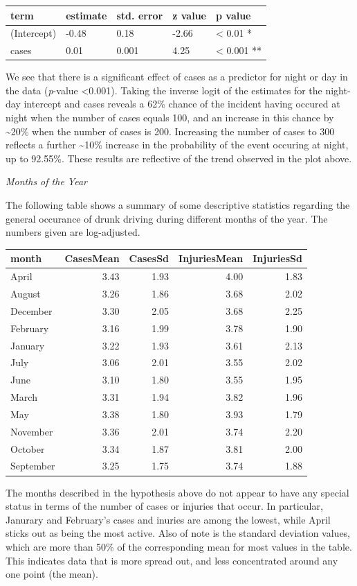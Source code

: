 \documentclass[floatsintext,man]{apa6}
\theoremstyle{definition}
\theoremstyle{definition}
\theoremstyle{definition}
\theoremstyle{remark}
\begin{document}
\begin{longtable}[]{@{}lllll@{}}
\toprule
term & estimate & std. error & z value & p value\tabularnewline
\midrule
\endhead
(Intercept) & -0.48 & 0.18 & -2.66 & \textless{} 0.01 *\tabularnewline
cases & 0.01 & 0.001 & 4.25 & \textless{} 0.001 **\tabularnewline
\bottomrule
\end{longtable}

We see that there is a significant effect of cases as a predictor for
night or day in the data (\emph{p}-value \textless{}0.001). Taking the
inverse logit of the estimates for the night-day intercept and cases
reveals a 62\% chance of the incident having occured at night when the
number of cases equals 100, and an increase in this chance by
\textasciitilde{}20\% when the number of cases is 200. Increasing the
number of cases to 300 reflects a further \textasciitilde{}10\% increase
in the probability of the event occuring at night, up to 92.55\%. These
results are reflective of the trend observed in the plot above.

\emph{Months of the Year}

The following table shows a summary of some descriptive statistics
regarding the general occurance of drunk driving during different months
of the year. The numbers given are log-adjusted.

\begin{longtable}[]{@{}lrrrr@{}}
\toprule
month & CasesMean & CasesSd & InjuriesMean & InjuriesSd\tabularnewline
\midrule
\endhead
April & 3.43 & 1.93 & 4.00 & 1.83\tabularnewline
August & 3.26 & 1.86 & 3.68 & 2.02\tabularnewline
December & 3.30 & 2.05 & 3.68 & 2.25\tabularnewline
February & 3.16 & 1.99 & 3.78 & 1.90\tabularnewline
January & 3.22 & 1.93 & 3.61 & 2.13\tabularnewline
July & 3.06 & 2.01 & 3.55 & 2.02\tabularnewline
June & 3.10 & 1.80 & 3.55 & 1.95\tabularnewline
March & 3.31 & 1.94 & 3.82 & 1.96\tabularnewline
May & 3.38 & 1.80 & 3.93 & 1.79\tabularnewline
November & 3.36 & 2.01 & 3.74 & 2.20\tabularnewline
October & 3.34 & 1.87 & 3.81 & 2.00\tabularnewline
September & 3.25 & 1.75 & 3.74 & 1.88\tabularnewline
\bottomrule
\end{longtable}

The months described in the hypothesis above do not appear to have any
special status in terms of the number of cases or injuries that occur.
In particular, Janurary and February's cases and inuries are among the
lowest, while April sticks out as being the most active. Also of note is
the standard deviation values, which are more than 50\% of the
corresponding mean for most values in the table. This indicates data
that is more spread out, and less concentrated around any one point (the
mean).
\end{document}
